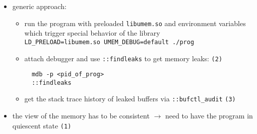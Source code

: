 \begin{itemize}
\item generic approach:
  \begin{itemize}
  \item run the program with preloaded \texttt{libumem.so} and environment
     variables which trigger special behavior of the library \\
     \texttt{LD\_PRELOAD=libumem.so UMEM\_DEBUG=default ./prog}
  \item attach debugger and use \texttt{::findleaks} to get memory leaks:
    \texttt{(2)}
\begin{verbatim}
  mdb -p <pid_of_prog>
  ::findleaks
\end{verbatim}
  \item get the stack trace history of leaked buffers via
      \texttt{::bufctl\_audit} \texttt{(3)}
  \end{itemize}
\item the view of the memory has to be consistent $\rightarrow$ need to
    have the program in quiescent state \texttt{(1)}
\end{itemize}

